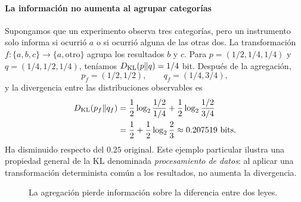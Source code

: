 \paragraph{La información no aumenta al agrupar categorías}

Supongamos que un experimento observa tres categorías, pero un instrumento
solo informa si ocurrió $a$ o si ocurrió alguna de las otras dos.
La transformación $f: \{a,b,c\}\to\{a,\mathrm{otro}\}$ agrupa
los resultados $b$ y $c$. Para
$p=(1/2,1/4,1/4)$ y $q=(1/4,1/2,1/4)$, teníamos
$D_{\rm KL}(p\|q)=1/4$ bit. Después de la agregación,
\[
 p_f=(1/2,1/2),\qquad q_f=(1/4,3/4),
\]
y la divergencia entre las distribuciones observables es
\[
\begin{split}
D_{\rm KL}(p_f\|q_f)
&=\frac12\log_2\frac{1/2}{1/4}
+\frac12\log_2\frac{1/2}{3/4}\\
&=\frac12+\frac12\log_2\frac23
\approx0.207519\ \text{bits}.
\end{split}
\]
Ha disminuido respecto del $0.25$ original. Este ejemplo particular
ilustra una propiedad general de la KL denominada \emph{procesamiento de
datos}: al aplicar una transformación determinista común a los
resultados, no aumenta la divergencia.

\begin{figure}[H]\centering
{}
\caption{La agregación pierde información sobre la diferencia entre dos leyes.}
\end{figure}

